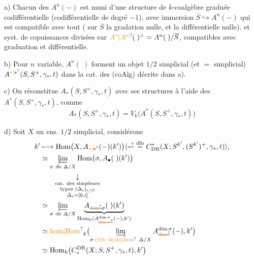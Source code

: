 a) Chacun des $A^n(-)$ est muni d'une structure de $k$-coalgèbre  graduée codifférentielle (codifférentielle de degré $-1$), avec immersion $\overline S\hookrightarrow A^n(-)$ qui est compatible avec tout ( sur $\overline S$ la gradation nulle, et la différentielle nulle). et  syst. de copuissances divisées sur $\unsure{A^*|A^n}(\;)^+=A^n(\;)/\overline S$, compatibles avec graduation et différentielle.

b) Pour $n$ variable,  $A^n(\;)$ forment un objet $1/2$ simplicial (et $=$ simplicial) $A^{\unsure{*|\bullet}}(S,S^+,\gamma_*,t)$ dans la cat. des  (coAlg) décrite dans a).

c) On réconstitue $A_*(S,S^+,\gamma_*,t)$  avec  ses structures à l'aide des $A^*(S,S^+,\gamma_*,t)$, comme
\[
 A_*(S,S^+,\gamma_*,t)=V_k\bigl(A^*(S,S^+,\gamma_*,t)\bigr)
\]

d) Soit $X$ un ens. $1/2$ simplicial, considérons
\[
\begin{aligned}
 k'&\longmapsto \mathrm{Hom}\bigl(X,A_{\unsure{*|\bullet}}(-)(k')\bigr)
 \inserted{\deleted{\unsure{*}}\mathrel{\overset{\mathrm{dfn}}{=}}C_{\mathrm{DR}}^*(X;S^{k'},(S^{k'})^+,\gamma_*,t)},\\
 &\simeq\varprojlim_{\sigma\ \mathrm{ds}\ \Delta/X}
 \mathrm{Hom}\bigl(\sigma,A_{\bullet}(\;)(k')\bigr)\\
 &\phantom{\simeq}\hspace{1em}\underset{\substack{\text{cat. des simplexes}\\\text{types }(\Delta_i)_{i\geq0}\\\Delta_i=[0,i]}}{\downarrow}\\
 &\simeq\varprojlim_{\sigma\ \mathrm{ds}\ \Delta/X}
 \underbrace{A_{\deleted{\unsure{\mathrm{dim}}}\sigma}(\;)(k')}
 _{\mathrm{Hom}_k(A_{\deleted{\unsure{\mathrm{dim}\,\sigma}}}^{\mathrm{dim}\,\sigma}(-),k')}\\
 &\simeq\mathrm{\unsure{hom|Hom}}_k
 \bigl(\varinjlim_{\sigma\,\unsure{\in\mathrm{Ob}\ \mathrm{de}|\mathrm{ds}|\mathrm{dans}}\ {\Delta/X}}
 A_{\deleted{\unsure{\mathrm{dim}}}}^{\mathrm{dim}\,\sigma}(-),k'\bigr)\\
 &\simeq\mathrm{Hom}_k\bigl(C_*^{\mathrm{DR}}(X;S,S^+,\gamma_*,t),k'\bigr)
\end{aligned}
\]

